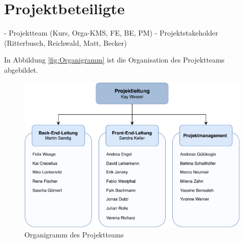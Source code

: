 \section{Projektbeteiligte}
- Projektteam (Kurs, Orga-KMS, FE, BE, PM)
- Projektstakeholder (Ritterbusch, Reichwald, Matt, Becker)

In Abbildung \vref{fig:Organigramm} ist die Organisation des Projektteams abgebildet. 

\begin{figure}[H]
	\centering 
	\includegraphics[width=12cm]{img/Organigramm.pdf}
	\captionsetup{format=hang}
	\caption[Organigramm des Projektteams]{\label{fig:Organigramm}Organigramm des Projektteams}
\end{figure}